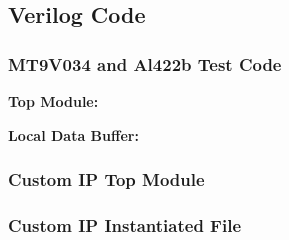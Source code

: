 \subsection{Verilog Code}
\subsubsection{MT9V034 and Al422b Test Code} \label{mt9v034TestCode}
\textbf{Top Module:}
\singlespacing

\doublespacing

\par
\textbf{Local Data Buffer:}
\singlespacing

\doublespacing

\par
\subsubsection{Custom IP Top Module} \label{customIPtop}
\singlespacing

\doublespacing

\par
\subsubsection{Custom IP Instantiated File} \label{customIPaxi}
\singlespacing

\doublespacing